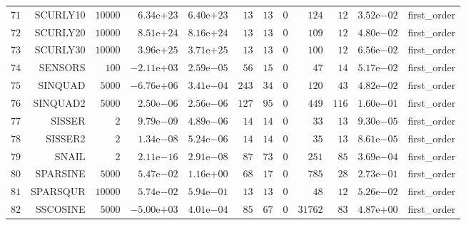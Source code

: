 \begin{longtable}{rrrrrrrrrrrr}
  \(    71\) & SCURLY10 & \( 10000\) & \( 6.34\)e\(+23\) & \( 6.40\)e\(+23\) & \(    13\) & \(    13\) & \(     0\) & \(   124\) & \(    12\) & \( 3.52\)e\(-02\) & first\_order \\
  \(    72\) & SCURLY20 & \( 10000\) & \( 8.51\)e\(+24\) & \( 8.16\)e\(+24\) & \(    13\) & \(    13\) & \(     0\) & \(   109\) & \(    12\) & \( 4.80\)e\(-02\) & first\_order \\
  \(    73\) & SCURLY30 & \( 10000\) & \( 3.96\)e\(+25\) & \( 3.71\)e\(+25\) & \(    13\) & \(    13\) & \(     0\) & \(   100\) & \(    12\) & \( 6.56\)e\(-02\) & first\_order \\
  \(    74\) & SENSORS & \(   100\) & \(-2.11\)e\(+03\) & \( 2.59\)e\(-05\) & \(    56\) & \(    15\) & \(     0\) & \(    47\) & \(    14\) & \( 5.17\)e\(-02\) & first\_order \\
  \(    75\) & SINQUAD & \(  5000\) & \(-6.76\)e\(+06\) & \( 3.41\)e\(-04\) & \(   243\) & \(    34\) & \(     0\) & \(   120\) & \(    43\) & \( 4.82\)e\(-02\) & first\_order \\
  \(    76\) & SINQUAD2 & \(  5000\) & \( 2.50\)e\(-06\) & \( 2.56\)e\(-06\) & \(   127\) & \(    95\) & \(     0\) & \(   449\) & \(   116\) & \( 1.60\)e\(-01\) & first\_order \\
  \(    77\) & SISSER & \(     2\) & \( 9.79\)e\(-09\) & \( 4.89\)e\(-06\) & \(    14\) & \(    14\) & \(     0\) & \(    33\) & \(    13\) & \( 9.30\)e\(-05\) & first\_order \\
  \(    78\) & SISSER2 & \(     2\) & \( 1.34\)e\(-08\) & \( 5.24\)e\(-06\) & \(    14\) & \(    14\) & \(     0\) & \(    35\) & \(    13\) & \( 8.61\)e\(-05\) & first\_order \\
  \(    79\) & SNAIL & \(     2\) & \( 2.11\)e\(-16\) & \( 2.91\)e\(-08\) & \(    87\) & \(    73\) & \(     0\) & \(   251\) & \(    85\) & \( 3.69\)e\(-04\) & first\_order \\
  \(    80\) & SPARSINE & \(  5000\) & \( 5.47\)e\(-02\) & \( 1.16\)e\(+00\) & \(    68\) & \(    17\) & \(     0\) & \(   785\) & \(    28\) & \( 2.73\)e\(-01\) & first\_order \\
  \(    81\) & SPARSQUR & \( 10000\) & \( 5.74\)e\(-02\) & \( 5.94\)e\(-01\) & \(    13\) & \(    13\) & \(     0\) & \(    48\) & \(    12\) & \( 5.26\)e\(-02\) & first\_order \\
  \(    82\) & SSCOSINE & \(  5000\) & \(-5.00\)e\(+03\) & \( 4.01\)e\(-04\) & \(    85\) & \(    67\) & \(     0\) & \( 31762\) & \(    83\) & \( 4.87\)e\(+00\) & first\_order \\

\end{longtable}
